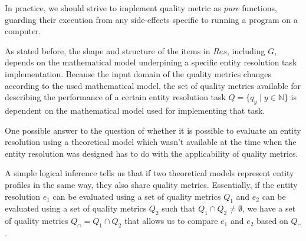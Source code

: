 In practice, we should strive to implement quality metric as \textit{pure}
functions, guarding their execution from any side-effects specific to
running a program on a computer.

As stated before, the shape and structure of the items in $Res$, including
$G$, depends on the mathematical model underpining a specific entity
resolution task implementation.
Because the input domain of the quality metrics changes according to the
used mathematical model, the set of quality metrics available for describing
the performance of a certain entity resolution task $Q = \{q_y \mid y \in
\mathbb{N}\}$ is dependent on the mathematical model used for implementing
that task.

One possible answer to the question of whether it is possible to evaluate
an entity resolution using a theoretical model which wasn't available at the
time when the entity resolution was designed has to do with the
applicability of quality metrics.

A simple logical inference tells us that if two theoretical models represent
entity profiles in the same way, they also share quality metrics.
Essentially, if the entity resolution $e_1$ can be evaluated using a set of
quality metrics $Q_1$ and $e_2$ can be evaluated using a set of quality
metrics $Q_2$ such that $Q_1 \cap Q_2 \neq \emptyset$, we have a set of
quality metrics $Q_\cap = Q_1 \cap Q_2$ that allows us to compare $e_1$ and
$e_2$ based on $Q_\cap$.